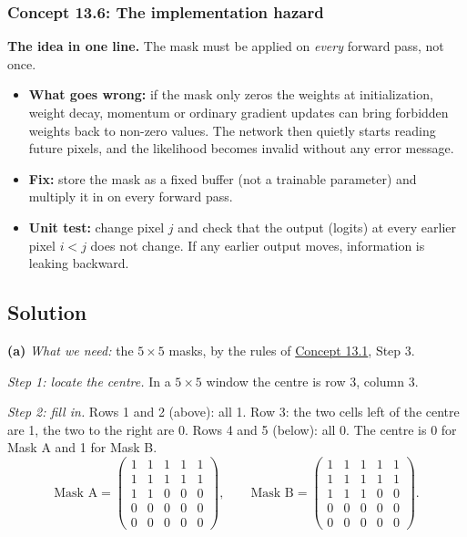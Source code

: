 \documentclass[12pt,a4paper]{article}
\begin{document}
\subsubsection{Concept 13.6: The implementation hazard}\label{c13-6}

\textbf{The idea in one line.} The mask must be applied on \emph{every} forward pass, not once.
\begin{itemize}[nosep]
  \item \textbf{What goes wrong:} if the mask only zeros the weights at initialization, weight decay, momentum or ordinary gradient updates can bring forbidden weights back to non-zero values. The network then quietly starts reading future pixels, and the likelihood becomes invalid without any error message.
  \item \textbf{Fix:} store the mask as a fixed buffer (not a trainable parameter) and multiply it in on every forward pass.
  \item \textbf{Unit test:} change pixel $j$ and check that the output (logits) at every earlier pixel $i<j$ does not change. If any earlier output moves, information is leaking backward.
\end{itemize}

\subsection{Solution}

\textbf{(a)} \emph{What we need:} the $5\times5$ masks, by the rules of \hyperref[c13-1]{Concept 13.1}, Step 3.

\emph{Step 1: locate the centre.} In a $5\times5$ window the centre is row 3, column 3.

\emph{Step 2: fill in.} Rows 1 and 2 (above): all 1. Row 3: the two cells left of the centre are 1, the two to the right are 0. Rows 4 and 5 (below): all 0. The centre is 0 for Mask A and 1 for Mask B.
\[
\text{Mask A}=\begin{pmatrix}1&1&1&1&1\\1&1&1&1&1\\1&1&0&0&0\\0&0&0&0&0\\0&0&0&0&0\end{pmatrix},\qquad
\text{Mask B}=\begin{pmatrix}1&1&1&1&1\\1&1&1&1&1\\1&1&1&0&0\\0&0&0&0&0\\0&0&0&0&0\end{pmatrix}.
\]
\end{document}
